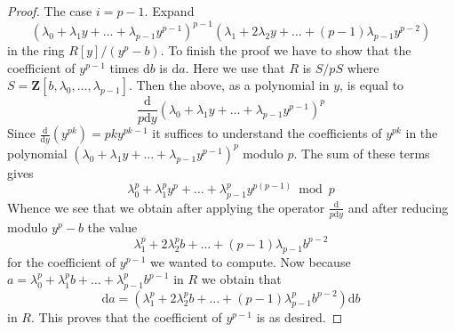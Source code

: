 \documentclass[10pt,a4paper]{amsart}
\theoremstyle{plain}
\theoremstyle{definition}
\theoremstyle{remark}
\numberwithin{equation}{subsection}
\begin{document}
\begin{proof}
\medskip\noindent
The case $i = p - 1$. Expand
$$
(\lambda_0 + \lambda_1 y + \ldots + \lambda_{p - 1}y^{p - 1})^{p - 1}
(\lambda_1 + 2 \lambda_2 y + \ldots + (p - 1)\lambda_{p - 1}y^{p - 2})
$$
in the ring $R[y]/(y^p - b)$. To finish the proof we have to show that
the coefficient of $y^{p - 1}$ times $\text{d}b$ is $\text{d}a$.
Here we use that $R$ is $S/pS$ where
$S = \mathbf{Z}[b, \lambda_0, \ldots, \lambda_{p - 1}]$.
Then the above, as a polynomial in $y$, is equal to
$$
\frac{\text{d}}{p\text{d}y}
(\lambda_0 + \lambda_1 y + \ldots + \lambda_{p - 1}y^{p - 1})^p
$$
Since $\frac{\text{d}}{\text{d}y}(y^{pk}) = pk y^{pk - 1}$
it suffices to understand the coefficients of $y^{pk}$ in the polynomial
$(\lambda_0 + \lambda_1 y + \ldots + \lambda_{p - 1}y^{p - 1})^p$
modulo $p$. The sum of these terms gives
$$
\lambda_0^p + \lambda_1^py^p + \ldots + \lambda_{p - 1}^py^{p(p - 1)}
\bmod p
$$
Whence we see that we obtain after applying the operator
$\frac{\text{d}}{p\text{d}y}$ and after reducing modulo $y^p - b$
the value
$$
\lambda_1^p + 2\lambda_2^pb + \ldots + (p - 1)\lambda_{p - 1}b^{p - 2}
$$
for the coefficient of $y^{p - 1}$ we wanted to compute. Now because
$a = \lambda_0^p + \lambda_1^p b + \ldots + \lambda_{p - 1}^pb^{p - 1}$
in $R$ we obtain that
$$
\text{d}a = (\lambda_1^p  + 2 \lambda_2^p b + \ldots +
(p - 1) \lambda_{p - 1}^p b^{p - 2}) \text{d}b
$$
in $R$. This proves that the coefficient of $y^{p - 1}$ is as desired.
\end{proof}
\end{document}
